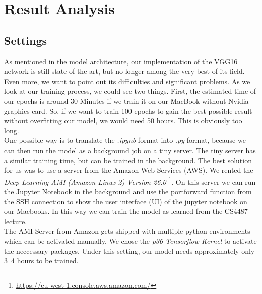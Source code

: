 \documentclass[journal]{IEEEtran}
\begin{document}
\section{Result Analysis}
\subsection{Settings}
As mentioned in the model architecture, our implementation of the VGG16 network is still state of the art, but no longer among the very best of its field. Even more, we want to point out its difficulties and significant problems. As we look at our training process, we could see two things. First, the estimated time of our epochs is around 30 Minutes if we train it on our MacBook without Nvidia graphics card. So, if we want to train 100 epochs to gain the best possible result without overfitting our model, we would need 50 hours. This is obviously too long. \\ One possible way is to translate the \textit{.ipynb} format into \textit{.py} format, because we can then run the model as a background job on a tiny server. The tiny server has a similar training time, but can be trained in the background. 
The best solution for us was to use a server from the Amazon Web Services (AWS). We rented the \textit{Deep Learning AMI (Amazon Linux 2) Version 26.0} \footnote{\href{https://eu-west-1.console.aws.amazon.com/}{https://eu-west-1.console.aws.amazon.com/}}. On this server we can run the Jupyter Notebook in the background and use the portforward function from the SSH connection to show the user interface (UI) of the jupyter notebook on our Macbooks. In this way we can train the model as learned from the CS4487 lecture. \\
The AMI Server from Amazon gets shipped with multiple python environments which can be activated manually. We chose the \textit{p36 Tensorflow Kernel} to activate the neccessary packages.
Under this setting, our model needs approximately only 3~4 hours to be trained. \\ 
\end{document}
